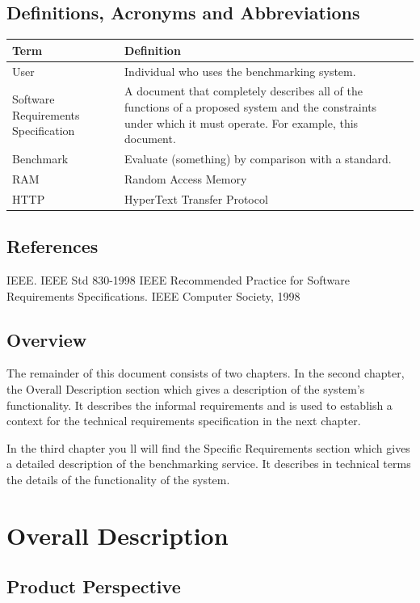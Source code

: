 \documentclass[a4paper,12pt]{article}
\begin{document}
\subsection{Definitions, Acronyms and Abbreviations}
\begin{center}
\begin{tabular}{ |p{5cm}|p{10cm}| } 
\hline
Term & Definition \\ 
\hline
User & Individual who uses the benchmarking system. \\ 
\hline
Software Requirements Specification & A document that completely describes all of the functions of a proposed system and the constraints under which it must operate. For example, this document. \\ 
\hline
Benchmark & Evaluate (something) by comparison with a standard. \\
\hline
RAM & Random Access Memory  \\
\hline
HTTP & HyperText Transfer Protocol \\
\hline
\end{tabular}
\end{center}

\subsection{References}
IEEE. IEEE Std 830-1998 IEEE Recommended Practice for Software Requirements Specifications. IEEE Computer Society, 1998

\subsection{Overview}
The remainder of this document consists of two chapters. In the second chapter, the Overall Description section which gives a description of the system's functionality. It describes the informal requirements and is used to establish a context for the technical requirements specification in the next chapter.

In the third chapter you ll will find the Specific Requirements section which gives a detailed description of the benchmarking service. It describes in technical terms the details of the functionality of the system.

\section{Overall Description}
\subsection{Product Perspective}
\end{document}
